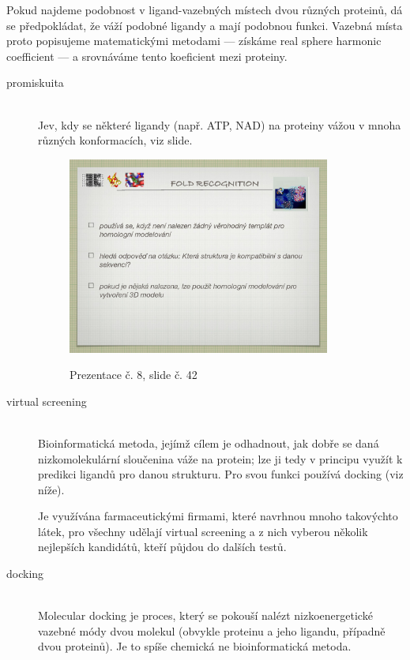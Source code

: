 \documentclass[DIV=8]{scrreprt}
\begin{document}
Pokud najdeme podobnost v ligand-vazebných místech dvou různých proteinů, dá se předpokládat, že váží podobné ligandy a mají podobnou funkci. Vazebná místa proto popisujeme matematickými metodami --- získáme real sphere harmonic coefficient --- a srovnáváme tento koeficient mezi proteiny.

\begin{description}
\item[promiskuita]\hfill \\
Jev, kdy se některé ligandy (např. ATP, NAD) na proteiny vážou v mnoha různých konformacích, viz slide. \begin{figure}
    \caption{Prezentace č. 8, slide č. 42}
    \includegraphics[width=0.85\textwidth]{slides-8/slide-42.jpg}
    \centering
    \label{slides-8-slide-42}
\end{figure}



\item[virtual screening]\hfill \\
Bioinformatická metoda, jejímž cílem je odhadnout, jak dobře se daná nizkomolekulární sloučenina váže na protein; lze ji tedy v principu využít k predikci ligandů pro danou strukturu. Pro svou funkci používá docking (viz níže).

Je využívána farmaceutickými firmami, které navrhnou mnoho takovýchto látek, pro všechny udělají virtual screening a z nich vyberou několik nejlepších kandidátů, kteří půjdou do dalších testů.


\item[docking]\hfill \\
Molecular docking je proces, který se pokouší nalézt nizkoenergetické vazebné módy dvou molekul (obvykle proteinu a jeho ligandu, případně dvou proteinů). Je to spíše chemická ne bioinformatická metoda.

\end{description}
\end{document}
